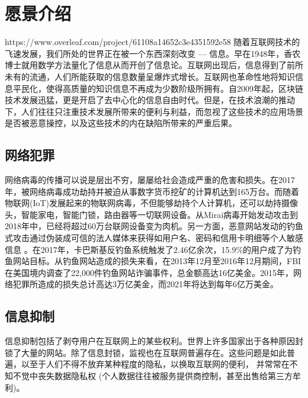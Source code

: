 \documentclass[a4paper]{article}
\begin{document}
\newpage

\tableofcontents

\newpage
\section{愿景介绍}https://www.overleaf.com/project/61108a14652c3e4351592e58
随着互联网技术的飞速发展，我们所处的世界正在被一个东西深刻改变 --- 信息。早在1948年，香农博士就用数学方法量化了信息从而开创了信息论\cite{shannon2001}。互联网出现后，信息得到了前所未有的流通，人们所能获取的信息数量呈爆炸式增长。互联网也革命性地将知识信息平民化，使得高质量的知识信息不再成为少数阶级所拥有。自2009年起，区块链技术发展迅猛，更是开启了去中心化的信息自由时代。但是，在技术浪潮的推动下，人们往往只注重技术发展所带来的便利与利益，而忽视了这些技术的应用场景是否被恶意操控，以及这些技术的内在缺陷所带来的严重后果。

\subsection{网络犯罪}
网络病毒的传播可以说是层出不穷，屡屡给社会造成严重的危害和损失\cite{timeline-computer-viruses}。在2017年，被网络病毒成功劫持并被迫从事数字货币挖矿的计算机达到165万台\cite{hijacking-mining}。而随着物联网(IoT)发展起来的物联网病毒，不但能够劫持个人计算机，还可以劫持摄像头，智能家电，智能门锁，路由器等一切联网设备。从Mirai病毒\cite{mirai}开始发动攻击到2018年中，已经将超过60万台联网设备变为肉机\cite{study-ddos-iot}。另一方面，恶意网站发动的钓鱼式攻击通过伪装成可信的法人媒体来获得如用户名、密码和信用卡明细等个人敏感信息 \cite{phishing}。在2017年，卡巴斯基反钓鱼系统触发了2.46亿余次，15.9\%的用户成了为钓鱼网站目标\cite{spam-phishing}。从钓鱼网站造成的损失来看，在2013年12月至2016年12月期间，FBI在美国境内调查了22,000件钓鱼网站诈骗事件，总金额高达16亿美金\cite{phishing-scam}。2015年，网络犯罪所造成的损失总计高达3万亿美金，而2021年将达到每年6亿万美金\cite{cybercrime-damages}。

\subsection{信息抑制}
信息抑制包括了剥夺用户在互联网上的某些权利\cite{block-internet}。世界上许多国家出于各种原因封锁了大量的网站\cite{list-blocked-india}\cite{list-blocked-russia}\cite{websites-blocked-china}。除了信息封锁，监视也在互联网普遍存在。这些问题是如此普遍，以至于人们不得不放弃某种程度的隐私，以换取互联网的便利\cite{private-security}， 并常常在不知不觉中丧失数据隐私权\cite{privacy-awareness} (个人数据往往被服务提供商控制，甚至出售给第三方牟利\cite{isp-sell-data}\cite{kosinski2013private})。\\
\end{document}
